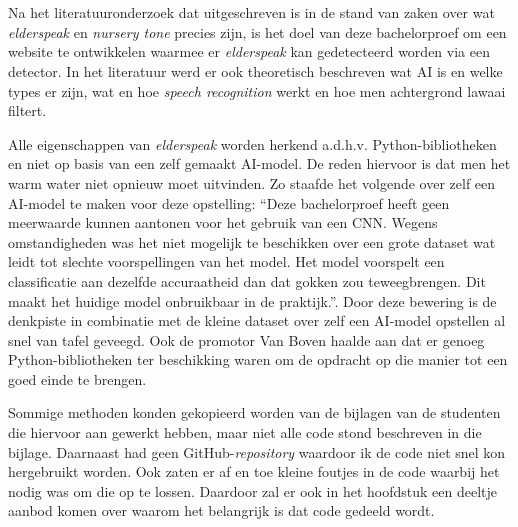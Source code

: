 
\chapter{}
\label{ch:methodologie}


Na het literatuuronderzoek dat uitgeschreven is in de stand van zaken over wat \textit{elderspeak} en \textit{nursery tone} precies zijn, is het doel van deze bachelorproef om een website te ontwikkelen waarmee er \textit{elderspeak} kan gedetecteerd worden via een detector. In het literatuur werd er ook theoretisch beschreven wat AI is en welke types er zijn, wat en hoe \textit{speech recognition} werkt en hoe men achtergrond lawaai filtert.

Alle eigenschappen van \textit{elderspeak} worden herkend a.d.h.v. Python-bibliotheken en niet op basis van een zelf gemaakt AI-model. De reden hiervoor is dat men het warm water niet opnieuw moet uitvinden. Zo staafde \textcite{Beeckman2021} het volgende over zelf een AI-model te maken voor deze opstelling: ``Deze bachelorproef heeft geen meerwaarde kunnen aantonen voor het gebruik van een CNN. Wegens omstandigheden was het niet mogelijk te beschikken over een grote dataset wat leidt tot slechte voorspellingen van het model. Het model voorspelt een classificatie aan dezelfde accuraatheid dan dat gokken zou teweegbrengen. Dit maakt het huidige model onbruikbaar in de praktijk.''. Door deze bewering is de denkpiste in combinatie met de kleine dataset over zelf een AI-model opstellen al snel van tafel geveegd. Ook de promotor Van Boven haalde aan dat er genoeg Python-bibliotheken ter beschikking waren om de opdracht op die manier tot een goed einde te brengen.

Sommige methoden konden gekopieerd worden van de bijlagen van de studenten die hiervoor aan gewerkt hebben, maar niet alle code stond beschreven in die bijlage. Daarnaast had \textcite{Standaert2021} geen GitHub-\textit{repository} waardoor ik de code niet snel kon hergebruikt worden. Ook zaten er af en toe kleine foutjes in de code waarbij het nodig was om die op te lossen. Daardoor zal er ook in het hoofdstuk een deeltje aanbod komen over waarom het belangrijk is dat code gedeeld wordt.

